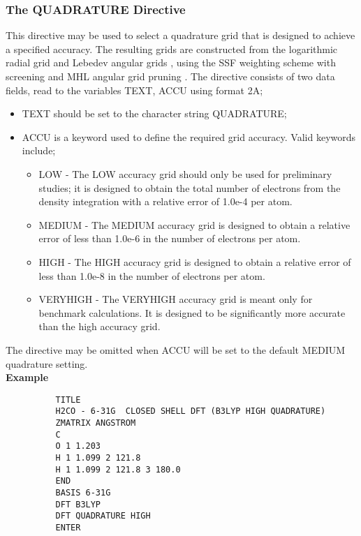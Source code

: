 \documentclass[11pt,fleqn]{article}
\begin{document}
\subsubsection{The QUADRATURE Directive}

This directive may be used to select a quadrature grid that is designed
to achieve a specified accuracy. The resulting grids are constructed
from the logarithmic radial grid \cite{mura96} and
Lebedev angular grids \cite{lebe99}, using the SSF weighting 
scheme with screening \cite{strat96} and MHL angular grid pruning 
\cite{murray93}.
The directive consists of two data fields, read to the variables TEXT,
ACCU  using format 2A;
\begin{itemize}
\item TEXT should be set to the character string QUADRATURE;
\item ACCU is a keyword used to define the required grid accuracy.
Valid keywords include;
\begin{itemize}
\item LOW - The LOW accuracy grid should only be used for preliminary
studies; it is designed to obtain the total number of electrons from
the density integration with a relative error of 1.0e-4 per atom.
\item MEDIUM - The MEDIUM accuracy grid is designed to obtain a
relative error of less than 1.0e-6 in the number of electrons per
atom.
\item HIGH - The HIGH accuracy grid is designed to obtain a relative
error of less than 1.0e-8 in the number of electrons per atom.
\item VERYHIGH - The VERYHIGH accuracy grid is meant only for benchmark 
calculations.  It is designed to be significantly more accurate than
the high accuracy grid.
\end{itemize}
\end{itemize}
The directive may be omitted when ACCU will be set to the default
MEDIUM quadrature setting.\\

{\bf Example}

{
\footnotesize
\begin{verbatim}
          TITLE
          H2CO - 6-31G  CLOSED SHELL DFT (B3LYP HIGH QUADRATURE)
          ZMATRIX ANGSTROM
          C
          O 1 1.203
          H 1 1.099 2 121.8
          H 1 1.099 2 121.8 3 180.0
          END
          BASIS 6-31G
          DFT B3LYP
          DFT QUADRATURE HIGH
          ENTER
\end{verbatim}
}
\end{document}
